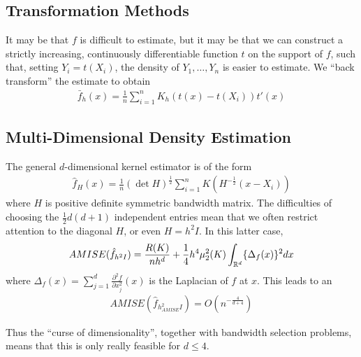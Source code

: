 \subsection{Transformation Methods}
\label{sec:transf-meth}

It may be that $f$ is difficult to estimate, but it may be that we
can construct a strictly increasing, continuously differentiable
function $t$ on the support of $f$, such that, setting $Y_{i} =
t(X_{i})$, the density of $Y_{1}, \dots, Y_{n}$ is easier to estimate.
We ``back transform'' the estimate to obtain
\begin{align}
  \label{eq:46}
  \bar f_{h}(x) = \frac{1}{n} \sum_{i=1}^{n} K_{h}(t(x) - t(X_{i})) t'(x)
\end{align}

\subsection{Multi-Dimensional Density Estimation}
\label{sec:multi-dimens-dens}

The general $d$-dimensional kernel estimator is of the form
\begin{align}
  \label{eq:47}
  \hat f_{H}(x) = \frac{1}{n} (\det H)^{\frac{1}{2}} \sum_{i=1}^{n}
  K(H^{-\frac{1}{2}}(x - X_{i}))
\end{align} where $H$ is positive definite symmetric bandwidth matrix.
The difficulties of choosing the $\frac{1}{2} d(d+1)$ independent
entries mean that we often restrict attention to the diagonal $H$, or
even $H = h^{2} I$.  In this latter case,
\begin{align}
  \label{eq:48}
  AMISE(\hat f_{h^{2}I}) = \frac{R(K)}{n h^{d}} + \frac{1}{4} h^{4}
  \mu_{2}^{2}(K) \int_{\mathbb{R}^{d}} \{ \Delta_{f}(x) \}^{2} dx
\end{align} where $\Delta_{f}(x) = \sum_{j=1}^{d} \frac{\partial^{2}
  f}{\partial x_{j}^{2}}(x)$ is the Laplacian of $f$ at $x$.  This leads
to an
\begin{align}
  \label{eq:49}
  AMISE(\hat f_{h^{2}_{AMISE}I}) = O(n^{-\frac{4}{d + 4}})
\end{align}

Thus the ``curse of dimensionality'', together with bandwidth
selection problems, means that this is only really feasible for $d
\leq 4$.


\iffalse
#+ORGTBL: SEND testtbl orgtbl-to-latex :splice nil :skip 0
| Kernel     | Efficiency |
|------------+------------|
| Epachnikov |        1.0 |
| Normal     |      0.951 |
| Triangular |      0.986 |
| Uniform    |      0.930 |
\fi